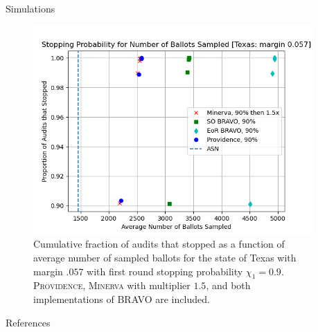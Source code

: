 \documentclass[final]{beamer}
\newcommand{\Minerva}{\textsc{Minerva}\xspace}
\newcommand{\Prov}{\textsc{Providence}\xspace}
\newcommand{\BRAVO}{\textsc{BRAVO}\xspace}
\newlength{\sepwidth}
\newlength{\colwidth}
\newcommand{\separatorcolumn}{\begin{column}{\sepwidth}\end{column}}
\begin{document}
\begin{frame}[t]
\begin{columns}[t]
\begin{column}{\colwidth}
\begin{block}{Simulations}
\begin{figure}
\includegraphics[width=.65\textwidth]{prov_asn.png}
\caption{Cumulative fraction of audits that stopped as a function of average number of sampled ballots for the state of Texas with margin $.057$ with first round stopping probability $\chi_1=0.9$. \Prov, \Minerva with multiplier $1.5$, and both implementations of \BRAVO are included.}
\label{fig:prov-asn}
\end{figure}

\end{block}

\begin{block}{References}




\end{block}

\end{column}

\separatorcolumn

\end{columns}

\end{frame}
\end{document}
